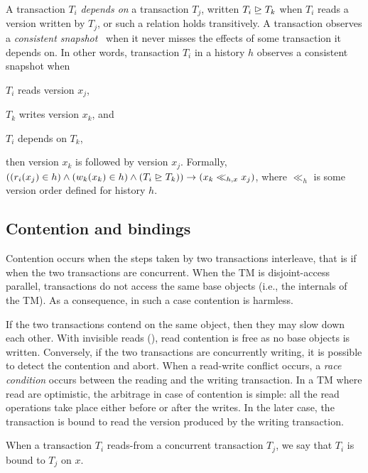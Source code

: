 A transaction $T_i$ \emph{depends on} a transaction $T_j$, written $T_i \mathrel{\unrhd} T_k$ when $T_i$ reads a version written by $T_j$, or such a relation holds transitively.
A transaction observes a \emph{consistent snapshot}~\cite{chandy1985distributed} when it never misses the effects of some transaction it depends on.
In other words, transaction $T_i$ in a history $h$ observes a consistent snapshot when
\begin{inparaenum}
\item $T_i$ reads version $x_j$,
\item $T_k$ writes version $x_k$, and 
\item $T_i$ depends on $T_{k}$,
\end{inparaenum}
then version $x_k$ is followed by version $x_j$.
Formally, $((r_i(x_j) \in h) \land (w_k(x_k) \in h) \land (T_i \depends T_k)) \implies (x_k \ll_{h,x} x_j)$, where $\ll_{h}$ is some version order defined for history $h$.

\subsection{Contention and bindings}

Contention occurs when the steps taken by two transactions interleave, that is if when the two transactions are concurrent.
When the TM is disjoint-access parallel, transactions do not access the same base objects (i.e., the internals of the TM).
As a consequence, in such a case contention is harmless.

If the two transactions contend on the same object, then they may slow down each other.
With invisible reads (), read contention is free as no base objects is written.
Conversely, if the two transactions are concurrently writing, it is possible to detect the contention and abort. %
When a read-write conflict occurs, a \emph{race condition} occurs between the reading and the writing transaction.
In a TM where read are optimistic, the arbitrage in case of contention is simple: all the read operations take place either before or after the writes.
In the later case, the transaction is bound to read the version produced by the writing transaction.

\begin{definition}[Binding]
  When a transaction $T_i$ reads-from a concurrent transaction $T_j$, we say that $T_i$ is bound to $T_j$ on $x$.
\end{definition}

